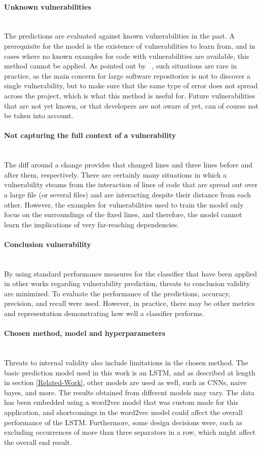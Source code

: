 \documentclass[
a4paper,
pagesize,
pdftex,
12pt,
twoside, %
BCOR=5mm, %
ngerman,
fleqn,
final,
]{scrartcl}
\begin{document}
	\paragraph{Unknown vulnerabilities}\mbox{}\\
	The predictions are evaluated against known vulnerabilities in the past. A prerequisite for the model is the existence of vulnerabilities to learn from, and in cases where no known examples for code with vulnerabilities are available, this method cannot be applied. As pointed out by ~\cite{Yamaguchi.2012}, such situations are rare in practice, as the main concern for large software repositories is not to discover a single vulnerability, but to make sure that the same type of error does not spread across the project, which is what this method is useful for. Future vulnerabilities that are not yet known, or that developers are not aware of yet, can of course not be taken into account.
	\paragraph{Not capturing the full context of a vulnerability}\mbox{}\\
	The diff around a change provides that changed lines and three lines before and after them, respectively. There are certainly many situations in which a vulnerability steams from the interaction of lines of code that are spread out over a large file (or several files) and are interacting despite their distance from each other. However, the examples for vulnerabilities used to train the model only focus on the surroundings of the fixed lines, and therefore, the model cannot learn the implications of very far-reaching dependencies.\\
	\paragraph{Conclusion vulnerability}\mbox{}\\
	By using standard performance measures for the classifier that have been applied in other works regarding vulnerability prediction, threats to conclusion validity are minimized. To evaluate the performance of the predictions, accuracy, precision, and recall were used. However, in practice, there may be other metrics and representation demonstrating how well a classifier performs.
	\paragraph{Chosen method, model and hyperparameters}\mbox{}\\
	Threats to internal validity also include limitations in the chosen method. The basic prediction model used in this work is an LSTM, and as described at length in section \ref{Related-Work}, other models are used as well, such as CNNs, naive bayes, and more. The results obtained from different models may vary. The data has been embedded using a word2vec model that was custom made for this application, and shortcomings in the word2vec model could affect the overall performance of the LSTM. Furthermore, some design decisions were, such as excluding occurrences of more than three separators in a row, which might affect the overall end result.  
\end{document}
